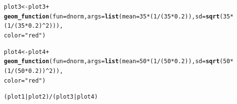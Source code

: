 \documentclass{article}\usepackage[]{graphicx}\usepackage[]{color}
\makeatletter
\newcommand{\hlnum}[1]{\textcolor[rgb]{0.686,0.059,0.569}{#1}}%
\newcommand{\hlstr}[1]{\textcolor[rgb]{0.192,0.494,0.8}{#1}}%
\newcommand{\hlopt}[1]{\textcolor[rgb]{0,0,0}{#1}}%
\newcommand{\hlstd}[1]{\textcolor[rgb]{0.345,0.345,0.345}{#1}}%
\newcommand{\hlkwb}[1]{\textcolor[rgb]{0.69,0.353,0.396}{#1}}%
\newcommand{\hlkwc}[1]{\textcolor[rgb]{0.333,0.667,0.333}{#1}}%
\newcommand{\hlkwd}[1]{\textcolor[rgb]{0.737,0.353,0.396}{\textbf{#1}}}%
\newenvironment{kframe}{%
 \def\at@end@of@kframe{}%
 \ifinner\ifhmode%
  \def\at@end@of@kframe{\end{minipage}}%
  \begin{minipage}{\columnwidth}%
 \fi\fi%
 \def\FrameCommand##1{\hskip\@totalleftmargin \hskip-\fboxsep
 \colorbox{shadecolor}{##1}\hskip-\fboxsep
     \hskip-\linewidth \hskip-\@totalleftmargin \hskip\columnwidth}%
 \MakeFramed {\advance\hsize-\width
   \@totalleftmargin\z@ \linewidth\hsize
   \@setminipage}}%
 {\par\unskip\endMakeFramed%
 \at@end@of@kframe}
\newenvironment{knitrout}{}{} %
\makeatother
\begin{document}
\begin{enumerate}
\begin{enumerate}
\begin{knitrout}
\begin{kframe}
\begin{alltt}
\hlstd{plot3} \hlkwb{<-} \hlstd{plot3}\hlopt{+}
  \hlkwd{geom_function}\hlstd{(}\hlkwc{fun}\hlstd{=dnorm,} \hlkwc{args}\hlstd{=}\hlkwd{list}\hlstd{(}\hlkwc{mean}\hlstd{=}\hlnum{35}\hlopt{*}\hlstd{(}\hlnum{1}\hlopt{/}\hlstd{(}\hlnum{35}\hlopt{*}\hlnum{0.2}\hlstd{)),} \hlkwc{sd}\hlstd{=}\hlkwd{sqrt}\hlstd{(}\hlnum{35}\hlopt{*}\hlstd{(}\hlnum{1}\hlopt{/}\hlstd{(}\hlnum{35}\hlopt{*}\hlnum{0.2}\hlstd{)}\hlopt{^}\hlnum{2}\hlstd{))),}
                \hlkwc{color}\hlstd{=}\hlstr{"red"}\hlstd{)}

\hlstd{plot4} \hlkwb{<-} \hlstd{plot4}\hlopt{+}
  \hlkwd{geom_function}\hlstd{(}\hlkwc{fun}\hlstd{=dnorm,} \hlkwc{args}\hlstd{=}\hlkwd{list}\hlstd{(}\hlkwc{mean}\hlstd{=}\hlnum{50}\hlopt{*}\hlstd{(}\hlnum{1}\hlopt{/}\hlstd{(}\hlnum{50}\hlopt{*}\hlnum{0.2}\hlstd{)),} \hlkwc{sd}\hlstd{=}\hlkwd{sqrt}\hlstd{(}\hlnum{50}\hlopt{*}\hlstd{(}\hlnum{1}\hlopt{/}\hlstd{(}\hlnum{50}\hlopt{*}\hlnum{0.2}\hlstd{))}\hlopt{^}\hlnum{2}\hlstd{)),}
                \hlkwc{color}\hlstd{=}\hlstr{"red"}\hlstd{)}

\hlstd{(plot1}\hlopt{|}\hlstd{plot2)}\hlopt{/}\hlstd{(plot3}\hlopt{|}\hlstd{plot4)}
\end{alltt}


{\ttfamily\noindent\color{warningcolor}{\#\# Warning: Removed 700 row(s) containing missing values (geom\_path).}}

{\ttfamily\noindent\color{warningcolor}{\#\# Warning: Removed 700 row(s) containing missing values (geom\_path).}}

{\ttfamily\noindent\color{warningcolor}{\#\# Warning: Removed 700 row(s) containing missing values (geom\_path).}}


\end{kframe}
\end{knitrout}
\end{enumerate}
\end{enumerate}
\end{document}
